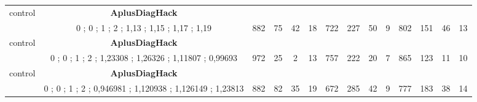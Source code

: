 \begin{table}[]
{\begin{tabular}{|c|c|c|c|c|c|c|c|c|c|c|c|c|c|}
control & \cellcolor{blue!15}\textbf{AplusDiagHack}& {\color[HTML]{00009B} } & {\color[HTML]{9A0000} } & {\color[HTML]{009901} } &  & {\color[HTML]{00009B} } & {\color[HTML]{9A0000} } & {\color[HTML]{009901} } &  & {\color[HTML]{00009B} } & {\color[HTML]{9A0000} } & {\color[HTML]{009901} } &  \\ 
 & \cellcolor{ blue!15}0 ; 0 ; 1 ; 2 ; 1,13 ; 1,15 ; 1,17 ; 1,19 & \multirow{-2}{*}{{\color[HTML]{00009B} 882}} & \multirow{-2}{*}{{\color[HTML]{9A0000} 75}} & \multirow{-2}{*}{{\color[HTML]{009901} 42}} & \multirow{-2}{*}{18} & \multirow{-2}{*}{{\color[HTML]{00009B} 722}} & \multirow{-2}{*}{{\color[HTML]{9A0000} 227}} & \multirow{-2}{*}{{\color[HTML]{009901} 50}} & \multirow{-2}{*}{9} & \multirow{-2}{*}{{\color[HTML]{00009B} 802}} & \multirow{-2}{*}{{\color[HTML]{9A0000} 151}} & \multirow{-2}{*}{{\color[HTML]{009901} 46}} & \multirow{-2}{*}{13} \\ \hline

control & \cellcolor{blue!15}\textbf{AplusDiagHack}& {\color[HTML]{00009B} } & {\color[HTML]{9A0000} } & {\color[HTML]{009901} } &  & {\color[HTML]{00009B} } & {\color[HTML]{9A0000} } & {\color[HTML]{009901} } &  & {\color[HTML]{00009B} } & {\color[HTML]{9A0000} } & {\color[HTML]{009901} } &  \\ 
 & \cellcolor{ blue!15}0 ; 0 ; 1 ; 2 ; 1,23308 ; 1,26326 ; 1,11807 ; 0,99693 & \multirow{-2}{*}{{\color[HTML]{00009B} 972}} & \multirow{-2}{*}{{\color[HTML]{9A0000} 25}} & \multirow{-2}{*}{{\color[HTML]{009901} 2}} & \multirow{-2}{*}{13} & \multirow{-2}{*}{{\color[HTML]{00009B} 757}} & \multirow{-2}{*}{{\color[HTML]{9A0000} 222}} & \multirow{-2}{*}{{\color[HTML]{009901} 20}} & \multirow{-2}{*}{7} & \multirow{-2}{*}{{\color[HTML]{00009B} 865}} & \multirow{-2}{*}{{\color[HTML]{9A0000} 123}} & \multirow{-2}{*}{{\color[HTML]{009901} 11}} & \multirow{-2}{*}{10} \\ \hline

control & \cellcolor{blue!15}\textbf{AplusDiagHack}& {\color[HTML]{00009B} } & {\color[HTML]{9A0000} } & {\color[HTML]{009901} } &  & {\color[HTML]{00009B} } & {\color[HTML]{9A0000} } & {\color[HTML]{009901} } &  & {\color[HTML]{00009B} } & {\color[HTML]{9A0000} } & {\color[HTML]{009901} } &  \\ 
 & \cellcolor{ blue!15}0 ; 0 ; 1 ; 2 ; 0,946981 ; 1,120938 ; 1,126149 ; 1,23813 & \multirow{-2}{*}{{\color[HTML]{00009B} 882}} & \multirow{-2}{*}{{\color[HTML]{9A0000} 82}} & \multirow{-2}{*}{{\color[HTML]{009901} 35}} & \multirow{-2}{*}{19} & \multirow{-2}{*}{{\color[HTML]{00009B} 672}} & \multirow{-2}{*}{{\color[HTML]{9A0000} 285}} & \multirow{-2}{*}{{\color[HTML]{009901} 42}} & \multirow{-2}{*}{9} & \multirow{-2}{*}{{\color[HTML]{00009B} 777}} & \multirow{-2}{*}{{\color[HTML]{9A0000} 183}} & \multirow{-2}{*}{{\color[HTML]{009901} 38}} & \multirow{-2}{*}{14} \\ \hline


\end{tabular}}
\end{table}
